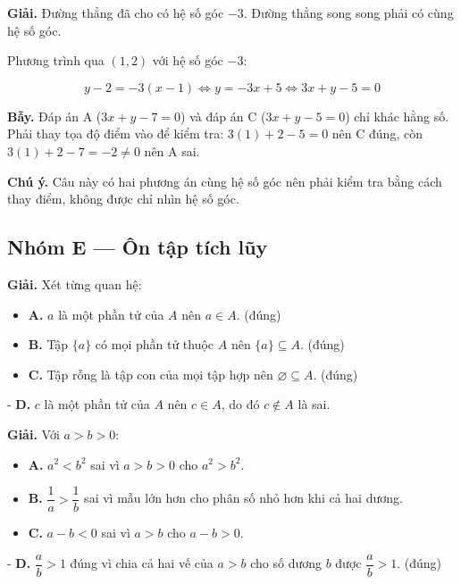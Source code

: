 \documentclass[11pt, a4paper]{article}
\begin{document}
\begin{dapan}[23 — Đáp án C]
\textbf{Giải.} Đường thẳng đã cho có hệ số góc $-3$. Đường thẳng song song phải có cùng hệ số góc.

Phương trình qua $(1,2)$ với hệ số góc $-3$:

$$y - 2 = -3(x - 1) \iff y = -3x + 5 \iff 3x + y - 5 = 0$$

\textbf{Bẫy.} Đáp án A ($3x + y - 7 = 0$) và đáp án C ($3x + y - 5 = 0$) chỉ khác hằng số. Phải thay tọa độ điểm vào để kiểm tra: $3(1) + 2 - 5 = 0$ nên C đúng, còn $3(1) + 2 - 7 = -2 \ne 0$ nên A sai.

\textbf{Chú ý.} Câu này có hai phương án cùng hệ số góc nên phải kiểm tra bằng cách thay điểm, không được chỉ nhìn hệ số góc.
\end{dapan}

\subsection*{Nhóm E — Ôn tập tích lũy}

\begin{dapan}[24 — Đáp án D]
\textbf{Giải.} Xét từng quan hệ:

\begin{itemize}[leftmargin=1.4em, itemsep=2pt]
\item \textbf{A.} $a$ là một phần tử của $A$ nên $a \in A$. (đúng)
\item \textbf{B.} Tập $\{a\}$ có mọi phần tử thuộc $A$ nên $\{a\} \subseteq A$. (đúng)
\item \textbf{C.} Tập rỗng là tập con của mọi tập hợp nên $\varnothing \subseteq A$. (đúng)
\end{itemize}

- \textbf{D.} $c$ là một phần tử của $A$ nên $c \in A$, do đó $c \notin A$ là sai.
\end{dapan}

\begin{dapan}[25 — Đáp án D]
\textbf{Giải.} Với $a > b > 0$:

\begin{itemize}[leftmargin=1.4em, itemsep=2pt]
\item \textbf{A.} $a^2 < b^2$ sai vì $a > b > 0$ cho $a^2 > b^2$.
\item \textbf{B.} $\dfrac{1}{a} > \dfrac{1}{b}$ sai vì mẫu lớn hơn cho phân số nhỏ hơn khi cả hai dương.
\item \textbf{C.} $a - b < 0$ sai vì $a > b$ cho $a - b > 0$.
\end{itemize}

- \textbf{D.} $\dfrac{a}{b} > 1$ đúng vì chia cả hai vế của $a > b$ cho số dương $b$ được $\dfrac{a}{b} > 1$. (đúng)
\end{dapan}
\end{document}
